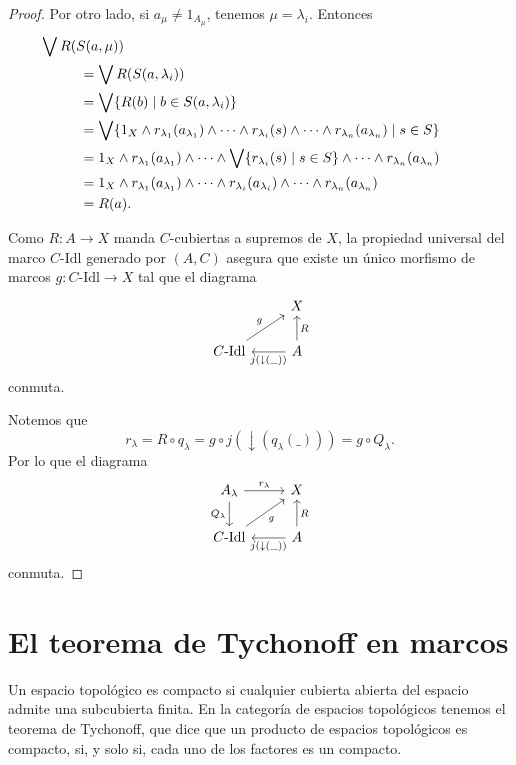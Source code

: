 \documentclass[12pt,letterpaper,titlepage]{article}
\theoremstyle{definition}
\newcommand\Sup{\bigvee}
\newcommand\down{{\downarrow}}
\renewcommand\inf{\wedge}
\newcommand\<{\langle}
\renewcommand\>{\rangle}
\newcommand\Idl{\text{-}\mathrm{Idl}}
\begin{document}
\begin{proof}
Por otro lado, si $a_\mu\neq 1_{A_\mu}$, tenemos $\mu=\lambda_i$.
Entonces
\begin{align*}
    &\hspace{-10mm}\Sup R(S(a,\mu)) \\
    &= \Sup R(S(a,\lambda_i)) \\
    &= \Sup\{R(b) \mid b\in S(a,\lambda_i)\} \\
    &= \Sup\{ 1_X\inf r_{\lambda_1}(a_{\lambda_1})\inf
        \cdots \inf r_{\lambda_i}(s)\inf\cdots\inf r_{\lambda_n}(a_{\lambda_n}) \mid s\in S\} \\
    &= 1_X\inf r_{\lambda_1}(a_{\lambda_1})\inf \cdots
        \inf\Sup\{ r_{\lambda_i}(s) \mid s\in S\} \inf
        \cdots\inf r_{\lambda_n}(a_{\lambda_n}) \\
    &= 1_X\inf r_{\lambda_1}(a_{\lambda_1})\inf \cdots
        \inf r_{\lambda_i}(a_{\lambda_i}) \inf
        \cdots\inf r_{\lambda_n}(a_{\lambda_n})
        \\
    &= R(a).
\end{align*}

Como $R:A\to X$ manda $C$-cubiertas a supremos de $X$,
la propiedad universal del marco $C\Idl$ generado por $(A,C)$
asegura que existe un único morfismo de marcos
$g\colon C\Idl\to X$ tal que el diagrama
\[
    \begin{tikzcd}[ampersand replacement=\&]
        \& X  \\
        C\Idl \ar[ru,"g"] \& A \ar[u,"R"'] \ar[l,"{j(\down({\_}))}"]
    \end{tikzcd}
\]
conmuta.

Notemos que
\[r_\lambda=R\circ q_\lambda=g\circ j(\down(q_\lambda(\_)))=g\circ Q_\lambda.\]
Por lo que el diagrama
\[
    \begin{tikzcd}[ampersand replacement=\&]
        A_\lambda \arrow[d, "Q_\lambda"'] \arrow[r, "r_\lambda"]
        \& X \\
        C\Idl \arrow[ru, "g"']
        \& A \arrow[l, "j(\down(\_))"] \arrow[u, "R"']
    \end{tikzcd}
\]
conmuta.
\end{proof}

\section{El teorema de Tychonoff en marcos}

Un espacio topológico es compacto si cualquier cubierta
abierta del espacio admite una subcubierta finita.
En la categoría de espacios topológicos tenemos el
teorema de Tychonoff, que dice que un producto de espacios
topológicos es compacto, si, y solo si, cada uno de los
factores es un compacto.
\end{document}

